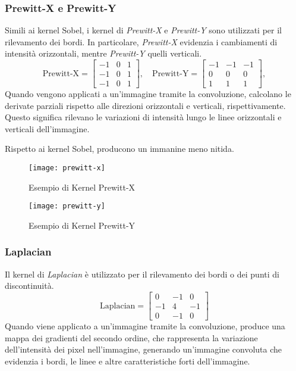 \subsubsection{Prewitt-X e Prewitt-Y}
Simili ai kernel Sobel, i kernel di \textit{Prewitt-X} e \textit{Prewitt-Y} sono utilizzati per il rilevamento dei bordi. In particolare, \textit{Prewitt-X} evidenzia i cambiamenti di intensità orizzontali, mentre \textit{Prewitt-Y} quelli verticali.\newline
\begin{equation*}
	\text {Prewitt-X} = 
	\begin{bmatrix}
		-1 & 0 & 1 \\
		-1 & 0 & 1 \\
		-1 & 0 & 1
	\end{bmatrix},
	\quad
	\text {Prewitt-Y} = 
	\begin{bmatrix}
		-1 & -1 & -1 \\
		0 & 0 & 0 \\
		1 & 1 & 1
	\end{bmatrix},
\end{equation*}
\newline Quando vengono applicati a un'immagine tramite la convoluzione, calcolano le derivate parziali rispetto alle direzioni orizzontali e verticali, rispettivamente. Questo significa rilevano le variazioni di intensità lungo le linee orizzontali e verticali dell'immagine.

Rispetto ai kernel Sobel, producono un immanine meno nitida.
\begin{figure}[H]
	\centering
	\texttt{[image: prewitt-x]}
	\caption{Esempio di Kernel Prewitt-X}
\end{figure}
\begin{figure}[H]
	\centering
	\texttt{[image: prewitt-y]}
	\caption{Esempio di Kernel Prewitt-Y}
\end{figure}
\subsubsection{Laplacian}
Il kernel di \textit{Laplacian} è utilizzato per il rilevamento dei bordi o dei punti di discontinuità.\newline
\begin{equation*}
	\text {Laplacian} = 
	\begin{bmatrix}
		0 & -1 & 0 \\
		-1 & 4 & -1 \\
		0 & -1 & 0
	\end{bmatrix}
\end{equation*}
\newline Quando viene applicato a un'immagine tramite la convoluzione, produce una mappa dei gradienti del secondo ordine, che rappresenta la variazione dell'intensità dei pixel nell'immagine, generando un'immagine convoluta che evidenzia i bordi, le linee e altre caratteristiche forti dell'immagine.

